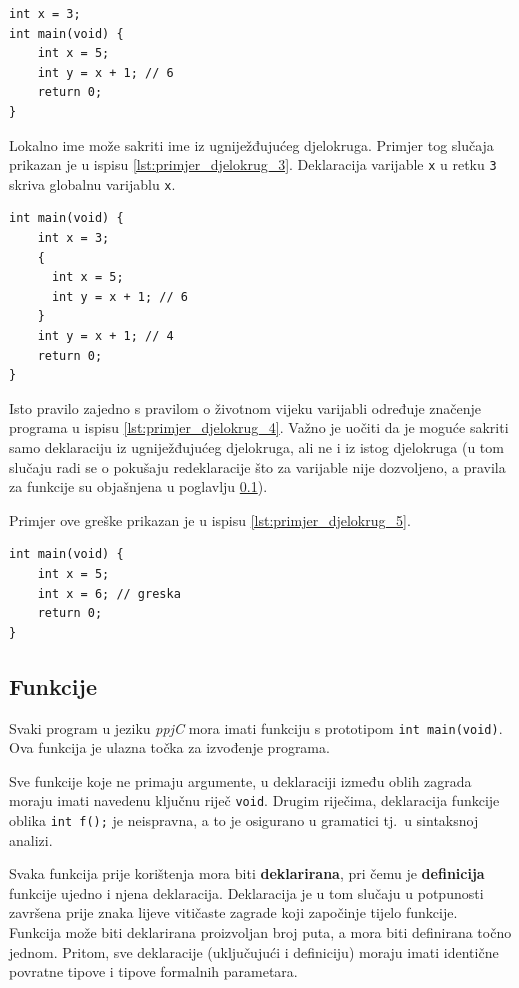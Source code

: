 \documentclass[times, 12pt, utf8]{book}
\begin{document}
\begin{lstlisting}[caption={Sakrivanje globalne deklaracije.},label=lst:primjer_djelokrug_3]
int x = 3;
int main(void) {
    int x = 5;
    int y = x + 1; // 6
    return 0;
}
\end{lstlisting}

Lokalno ime može sakriti ime iz ugniježđujućeg djelokruga.
Primjer tog slučaja prikazan je u ispisu \ref{lst:primjer_djelokrug_3}.
Deklaracija varijable \verb|x| u retku \verb|3| skriva globalnu varijablu \verb|x|.

\begin{lstlisting}[caption={Sakrivanje deklaracije u bloku.},label=lst:primjer_djelokrug_4]
int main(void) {
    int x = 3;
    {
      int x = 5;
      int y = x + 1; // 6
    }
    int y = x + 1; // 4
    return 0;
}
\end{lstlisting}

Isto pravilo zajedno s pravilom o životnom vijeku varijabli određuje značenje programa u ispisu \ref{lst:primjer_djelokrug_4}.
Važno je uočiti da je moguće sakriti samo deklaraciju iz ugniježđujućeg djelokruga, ali ne i iz istog djelokruga (u tom slučaju radi se o pokušaju redeklaracije što za varijable nije dozvoljeno, a pravila za funkcije su objašnjena u poglavlju \ref{sec:semantika_funkcije}).

Primjer ove greške prikazan je u ispisu \ref{lst:primjer_djelokrug_5}.

\begin{lstlisting}[caption={Nedozvoljena redeklaracija varijable.},label=lst:primjer_djelokrug_5]
int main(void) {
    int x = 5;
    int x = 6; // greska
    return 0;
}
\end{lstlisting}

\subsection{Funkcije}\label{sec:semantika_funkcije}
Svaki program u jeziku \emph{ppjC} mora imati funkciju s prototipom \verb|int main(void)|.
Ova funkcija je ulazna točka za izvođenje programa.

Sve funkcije koje ne primaju argumente, u deklaraciji između oblih zagrada moraju imati navedenu ključnu riječ \verb|void|.
Drugim riječima, deklaracija funkcije oblika \verb|int f();| je neispravna, a to je osigurano u gramatici tj.~u sintaksnoj analizi.

Svaka funkcija prije korištenja mora biti \textbf{deklarirana}, pri čemu je \textbf{definicija} funkcije ujedno i njena deklaracija.
Deklaracija je u tom slučaju u potpunosti završena prije znaka lijeve vitičaste zagrade koji započinje tijelo funkcije.
Funkcija može biti deklarirana proizvoljan broj puta, a mora biti definirana točno jednom.
Pritom, sve deklaracije (uključujući i definiciju) moraju imati identične povratne tipove i tipove formalnih parametara.
\end{document}
